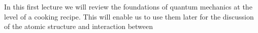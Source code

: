 In this first lecture we will review the foundations of quantum mechanics at the level of a cooking recipe. This will enable us to use them later for the discussion of the atomic structure and interaction between 